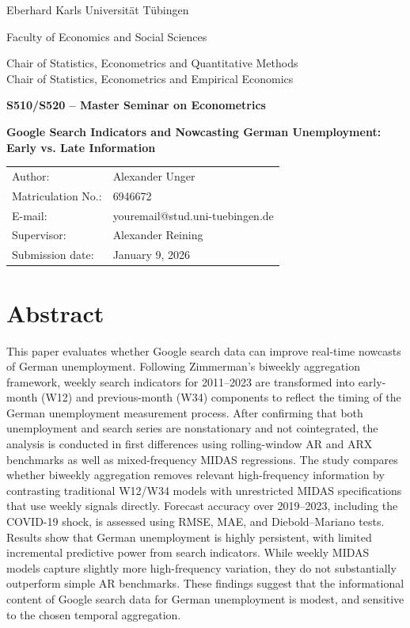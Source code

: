 \documentclass[12pt,a4paper]{article}
\makeatletter
\newcommand{\university}{Eberhard Karls Universität Tübingen}
\newcommand{\faculty}{Faculty of Economics and Social Sciences}
\newcommand{\seminar}{S510/S520 – Master Seminar on Econometrics}
\newcommand{\chairA}{Chair of Statistics, Econometrics and Quantitative Methods}
\newcommand{\chairB}{Chair of Statistics, Econometrics and Empirical Economics}
\newcommand{\supervisor}{Alexander Reining}
\newcommand{\authorname}{Alexander Unger}
\newcommand{\matricno}{6946672}
\newcommand{\emailaddr}{youremail@stud.uni-tuebingen.de}
\newcommand{\thesistitle}{Google Search Indicators and Nowcasting German
Unemployment: Early vs. Late Information}
\newcommand{\submissiondate}{January 9, 2026}
\makeatother
\begin{document}
\begin{titlepage}
  \centering
  {\large \university \par}
  \vspace{2mm}
  {\large \faculty \par}
  \vspace{18mm}
  {\large \chairA\\[2mm]\chairB\par}
  \vspace{18mm}
  {\Large \textbf{\seminar}\par}
  \vspace{18mm}
  {\LARGE \textbf{\thesistitle}\par}
  \vspace{18mm}
  \begin{tabular}{ll}
    Author:      & \authorname \\
    Matriculation No.: & \matricno \\
    E-mail:      & \emailaddr \\
    Supervisor:  & \supervisor \\
    Submission date: & \submissiondate \\
  \end{tabular}
  \vfill
\end{titlepage}



\section*{Abstract}
This paper evaluates whether Google search data can improve real-time nowcasts of German unemployment. Following Zimmerman’s biweekly aggregation framework, weekly search indicators for 2011–2023 are transformed into early-month (W12) and previous-month (W34) components to reflect the timing of the German unemployment measurement process. After confirming that both unemployment and search series are nonstationary and not cointegrated, the analysis is conducted in first differences using rolling-window AR and ARX benchmarks as well as mixed-frequency MIDAS regressions.
The study compares whether biweekly aggregation removes relevant high-frequency information by contrasting traditional W12/W34 models with unrestricted MIDAS specifications that use weekly signals directly. Forecast accuracy over 2019–2023, including the COVID-19 shock, is assessed using RMSE, MAE, and Diebold–Mariano tests.
Results show that German unemployment is highly persistent, with limited incremental predictive power from search indicators. While weekly MIDAS models capture slightly more high-frequency variation, they do not substantially outperform simple AR benchmarks. These findings suggest that the informational content of Google search data for German unemployment is modest, and sensitive to the chosen temporal aggregation.
\newpage
\tableofcontents
\newpage
\listoffigures %
\newpage
\listoftables  %
\newpage
\end{document}
